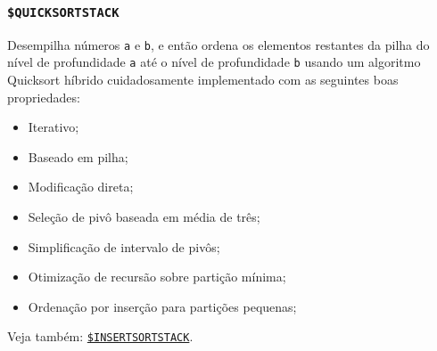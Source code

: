 \documentclass[12pt,a4paper]{report}
\newcommand{\kwd}[1]{\texttt{\textcolor{keyword}{#1}}}
\newcommand{\SINSERTSORTSTACK}{\kwd{\$INSERTSORTSTACK}}   %
\newcommand{\SQUICKSORTSTACK}{\kwd{\$QUICKSORTSTACK}}   %
\numberwithin{theorem}{chapter}
\begin{document}
\subsubsection{\SQUICKSORTSTACK}\label{SQUICKSORTSTACK}
Desempilha números \texttt{a} e \texttt{b}, e então ordena os
elementos restantes da pilha do nível de profundidade \texttt{a} até o
nível de profundidade \texttt{b} usando um algoritmo Quicksort híbrido
cuidadosamente implementado com as seguintes boas propriedades:
\begin{itemize}
\item Iterativo;
\item Baseado em pilha;
\item Modificação direta;
\item Seleção de pivô baseada em média de três;
\item Simplificação de intervalo de pivôs;
\item Otimização de recursão sobre partição mínima;
\item Ordenação por inserção para partições pequenas;
\end{itemize}
Veja também: \hyperref[SINSERTSORTSTACK]{\SINSERTSORTSTACK}.
\end{document}
